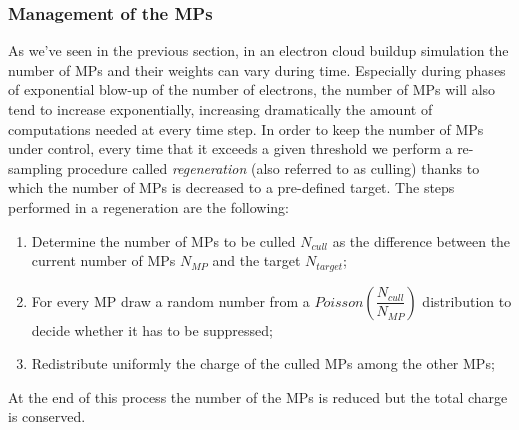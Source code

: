 \subsubsection{Management of the MPs}
As we've seen in the previous section, in an electron cloud buildup simulation the number of MPs and their weights can vary during time. Especially during phases of exponential blow-up of the number of electrons, the number of MPs will also tend to increase exponentially, increasing dramatically the amount of computations needed at every time step. In order to keep the number of MPs under control, every time that it exceeds a given threshold  we perform a re-sampling procedure called \textit{regeneration} (also referred to as culling) thanks to which the number of MPs is decreased to a pre-defined target.
The steps performed in a regeneration are the following:
\begin{BoxedText*}
\begin{enumerate}
    \item Determine the number of MPs to be culled $N_{cull}$ as the difference between the current number of MPs $N_{MP}$ and the target $N_{target}$;
    \item For every MP draw a random number from a $Poisson\left(\dfrac{N_{cull}}{N_{MP}}\right)$ distribution to decide whether it has to be suppressed;
    \item Redistribute uniformly the charge of the culled MPs among the other MPs;
\end{enumerate}
\end{BoxedText*}

At the end of this process the number of the MPs is reduced but the total charge is conserved.\\

